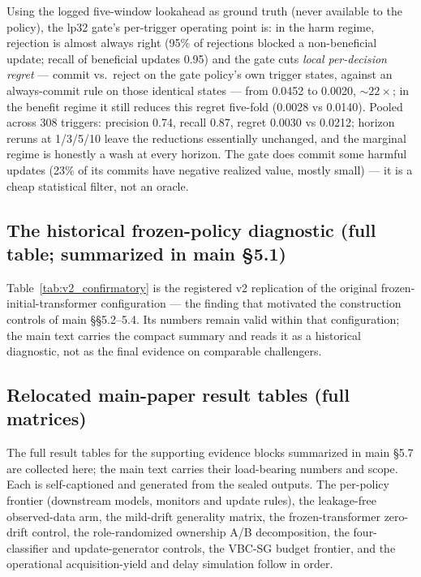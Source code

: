 \documentclass[a4paper,11pt]{article}
\makeatletter
\let\supp@subsection\subsection
\renewcommand{\subsection}{\FloatBarrier\supp@subsection}
\makeatother
\begin{document}
Using the logged five-window lookahead as ground truth (never available to the policy), the
lp32 gate's per-trigger operating point is: in the harm regime, rejection is almost always
right (95\% of rejections blocked a non-beneficial update; recall of beneficial updates 0.95)
and the gate cuts \emph{local per-decision regret} --- commit vs.\ reject on the gate policy's
own trigger states, against an always-commit rule on those identical states --- from 0.0452
to 0.0020, ${\sim}22\times$; in the benefit regime it still reduces this regret five-fold
(0.0028 vs 0.0140). Pooled across 308 triggers: precision 0.74, recall 0.87, regret 0.0030
vs 0.0212; horizon reruns at 1/3/5/10 leave the reductions essentially unchanged, and the
marginal regime is honestly a wash at every horizon. The gate does commit some harmful
updates (23\% of its commits have negative realized value, mostly small) --- it is a cheap
statistical filter, not an oracle.

\subsection{The historical frozen-policy diagnostic (full table; summarized in main \S5.1)}

Table~\ref{tab:v2_confirmatory} is the registered v2 replication of the original
frozen-initial-transformer configuration --- the finding that motivated the construction
controls of main \S\S5.2--5.4. Its numbers remain valid within that configuration; the
main text carries the compact summary and reads it as a historical diagnostic, not as the
final evidence on comparable challengers.



\subsection{Relocated main-paper result tables (full matrices)}
\label{sec:S2_relocated}

The full result tables for the supporting evidence blocks summarized in main \S5.7 are collected
here; the main text carries their load-bearing numbers and scope. Each is self-captioned and
generated from the sealed outputs. The per-policy frontier (downstream models, monitors and update
rules), the leakage-free observed-data arm, the mild-drift generality matrix, the frozen-transformer
zero-drift control, the role-randomized ownership A/B decomposition, the four-classifier and
update-generator controls, the VBC-SG budget frontier, and the operational acquisition-yield and
delay simulation follow in order.
\end{document}
